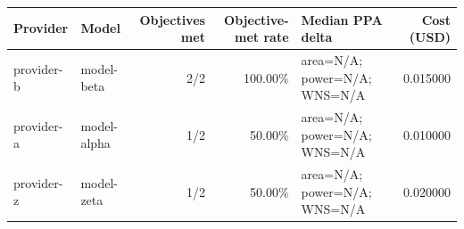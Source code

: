 \begin{tabular}{llrrlr}
\toprule
Provider & Model & Objectives met & Objective-met rate & Median PPA delta & Cost (USD) \\
\midrule
provider-b & model-beta & 2/2 & 100.00\% & area=N/A; power=N/A; WNS=N/A & 0.015000 \\
provider-a & model-alpha & 1/2 & 50.00\% & area=N/A; power=N/A; WNS=N/A & 0.010000 \\
provider-z & model-zeta & 1/2 & 50.00\% & area=N/A; power=N/A; WNS=N/A & 0.020000 \\
\bottomrule
\end{tabular}
